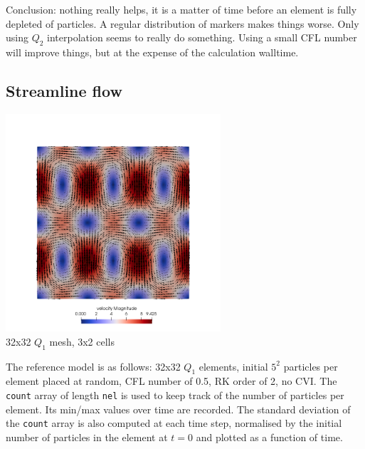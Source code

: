 Conclusion: nothing really helps, it is a matter of time before an element is fully depleted of particles. 
A regular distribution of markers makes things worse. Only using $Q_2$ interpolation seems to really do 
something. Using a small CFL number will improve things, but at the expense of the calculation walltime. 

\newpage
\subsection*{Streamline flow}


\begin{center}
\includegraphics[width=8cm]{python_codes/fieldstone_30/results_streamline/vel}\\
{\captionfont 32x32 $Q_1$ mesh, 3x2 cells}
\end{center}

The reference model is as follows: 32x32 $Q_1$ elements, initial $5^2$ particles per element placed at random, 
CFL number of 0.5, RK order of 2, no CVI.
The {\tt count} array of length {\tt nel} is used to keep track of the number of particles per element. 
Its min/max values over time are recorded. The standard deviation of the {\tt count} array is also 
computed at each time step, normalised by the 
initial number of particles in the element at $t=0$ and plotted as a function of time. 

